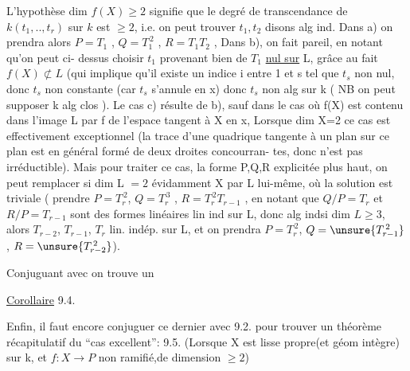 
L'hypothèse  dim $f(X)\geqslant 2$  signifie que  le degré de transcendance de
$k(t_1,..,t_r)$ sur $k$  est $\geqslant 2$, i.e. on peut trouver  $t_1,t_2$ disons alg ind.
Dans a) on prendra alors   $P = T_1$ , $Q = T_1^{\,2}$ , $R = T_1T_2$ , Dans b), on
fait pareil,  en notant qu'on peut ci-%
dessus choisir $t_1$ provenant bien de $T_1$ \uline{nul sur} L, grâce au fait $f(X)\not\subset L$
(qui implique qu'il  existe un indice  i  entre 1 et s tel que $t_s$ non
nul, donc $t_s$ non constante (car $t_s$ s'annule en x) donc $t_s$  non alg sur k
( NB on peut supposer k alg clos ).  Le cas c) résulte de b),  sauf dans le cas où  f(X) est contenu dans
l'image L par f de l'espace tangent à X en x,  \hand{[}Lorsque dim X=2
ce cas est effectivement exceptionnel (la trace d'une quadrique tangente
à un plan sur ce plan est en général formé de deux droites concourran-%
tes, donc n'est pas irréductible)\hand{]}. Mais pour traiter ce cas,  la
forme P,Q,R explicitée plus haut, on peut remplacer si dim L $=2$ évidamment X par
L lui-même, où la solution est triviale ( prendre $P=T_r^{\,2}$, $Q=T_r^{\,3}$ ,
$R = T_r^{\,2}T_{r-1}$ , en notant que  $Q/P = T_r$ et  $R/P = T_{r-1}$ sont des formes
linéaires lin ind sur L, donc alg indsi dim $L\geqslant 3$, alors $T_{r-2}$, $T_{r-1}$, $T_r$ lin. indép. sur L, et on prendra $P=T_r^{\,2}$, $Q=\unsure{T_{r-1}^{\,2}}$, $R=\unsure{T_{r-2}^{\,2}}$). 

Conjuguant avec  on trouve un

\uline{Corollaire} 9.4.   

Enfin, il faut encore conjuguer  ce dernier avec 9.2. pour
trouver un théorème récapitulatif  du ``cas excellent'':
 9.5.   (Lorsque X est lisse  propre(et géom intègre) sur k, et $f:X\to P$ non
ramifié,de dimension $\geqslant 2$)

